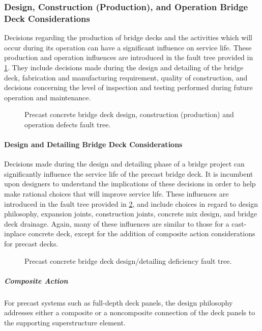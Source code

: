 \subsubsection{Design, Construction (Production), and Operation Bridge Deck Considerations}
Decisions regarding the production of bridge decks and the activities which will occur during its operation can have a significant influence on service life. These production and operation influences are introduced in the fault tree provided in \cref{fig:fault-tree-precast-deck-operation}. They include decisions made during the design and detailing of the bridge deck, fabrication and manufacturing requirement, quality of construction, and decisions concerning the level of inspection and testing performed during future operation and maintenance.

\begin{figure}
  \caption{Precast concrete bridge deck design, construction (production) and operation defects fault tree.}
  \label{fig:fault-tree-precast-deck-operation}
\end{figure}

\paragraph{Design and Detailing Bridge Deck Considerations}
Decisions made during the design and detailing phase of a bridge project can significantly influence the service life of the precast bridge deck. It is incumbent upon designers to understand the implications of these decisions in order to help make rational choices that will improve service life. These influences are introduced in the fault tree provided in \cref{fig:fault-tree-precast-deck-design}, and include choices in regard to design philosophy, expansion joints, construction joints, concrete mix design, and bridge deck drainage. Again, many of these influences are similar to those for a cast-inplace concrete deck, except for the addition of composite action considerations for precast decks.

\begin{figure}
  \caption{Precast concrete bridge deck design/detailing deficiency fault tree.}\label{fig:fault-tree-precast-deck-design}
\end{figure}

\subparagraph*{Composite Action}
For precast systems such as full-depth deck panels, the design philosophy addresses either a composite or a noncomposite connection of the deck panels to the supporting superstructure element.

